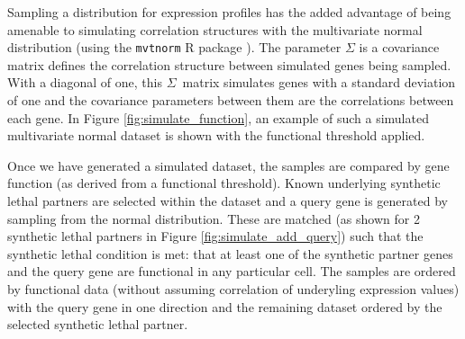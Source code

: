 Sampling a distribution for expression profiles has the added advantage of being amenable to simulating correlation structures with the multivariate normal distribution (using the \texttt{mvtnorm} R package \citep{Genz2009, mvtnorm}). The parameter $\Sigma$ is a covariance matrix defines the correlation structure between simulated genes being sampled. With a diagonal of one, this $\Sigma$\ matrix simulates genes with a standard deviation of one and the covariance parameters between them are the correlations between each gene. In Figure \ref{fig:simulate_function}, an example of such a simulated multivariate normal dataset is shown with the functional threshold applied.


Once we have generated a simulated dataset, the samples are compared by gene function (as derived from a functional threshold). Known underlying synthetic lethal partners are selected within the dataset and a query gene is generated by sampling from the normal distribution. These are matched (as shown for 2 synthetic lethal partners in Figure \ref{fig:simulate_add_query}) such that the synthetic lethal condition is met: that at least one of the synthetic partner genes and the query gene are functional in any particular cell. The samples are ordered by functional data (without assuming correlation of underyling expression values) with the query gene in one direction and the remaining dataset ordered by the selected synthetic lethal partner.

